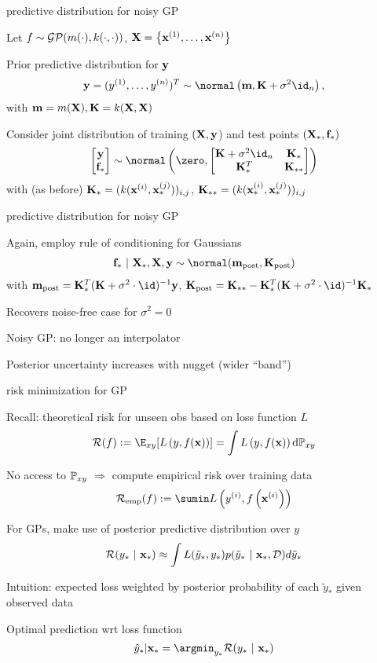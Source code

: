 \documentclass[11pt,compress,t,notes=noshow, xcolor=table]{beamer}
\begin{document}
\begin{framei}[sep=L]{predictive distribution for noisy GP}
\item Let $f \sim \GPmk$, $\Xmat = \xdat$
\item Prior predictive distribution for $\yv$
$$
\yv = (\yi[1], \dots, \yi[n])^T
\sim \normal\left(\mv, \Kmat + \sigma^2 \id_n \right),
$$
with $\mv = m(\Xmat), \Kmat = k(\Xmat, \Xmat)$
\item Consider joint distribution of training $(\Xmat, \yv$) and test points $(\Xmat_*, \fv_*)$
$$
\begin{bmatrix} \yv \\ \fv_* \end{bmatrix} \sim  
\normal\left(\zero, \begin{bmatrix} \Kmat + \sigma^2 \id_n & \Ks \\ \Ks^T & \Kss \end{bmatrix}\right)
$$
with (as before) $\Ks = (k(\xi, \xs^{(j)}))_{i,j}$, $\Kss = (k(\xi[i]_*, \xi[j]_*))_{i,j}$
\end{framei}

\begin{framei}[sep=M]{predictive distribution for noisy GP}
\item Again, employ rule of conditioning for Gaussians 
\begin{eqnarray*}
\fv_* ~|~ \Xmat_*, \Xmat, \yv \sim \normal(\mv_{\text{post}}, \Kmat_\text{post})
\end{eqnarray*}
with 
$\mv_{\text{post}} = \Ks^{T} (\Kmat+ \sigma^2 \cdot \id)^{-1}\yv$, 
$\Kmat_\text{post} = \Kss - \Ks^T (\Kmat  + \sigma^2 \cdot \id)^{-1}\Ks$
\item Recovers noise-free case for $\sigma^2 = 0$
\item Noisy GP: no longer an interpolator 
\item Posterior uncertainty increases with nugget (wider ``band'')
\vfill
{}
\end{framei}

\begin{framei}[sep=M]{risk minimization for GP}
\item Recall: theoretical risk for unseen obs based on loss function $L$
$$\riskf := \E_{xy} [\Lxy] = \int \Lxy \text{d}\Pxy$$ 
\item No access to $\Pxy$ $\Rightarrow$ compute empirical risk over training data $$\riske(f) := \sumin \Lxyi$$ 
\item For GPs, make use of posterior predictive distribution over $y$
$$
    \mathcal{R}(y_* ~|~ \xs) \approx \int L(\tilde y_*, y_*) p(\tilde y_*~|~\xs, \D)d\tilde y_*
  $$
\item Intuition: expected loss weighted by posterior probability of each $\tilde y_*$ given observed data
\item Optimal prediction wrt loss function
$$
    \yh_* | \xs = \argmin_{y_*} \mathcal{R}(y_*~|~ \xs)
  $$
\end{framei}
\end{document}
